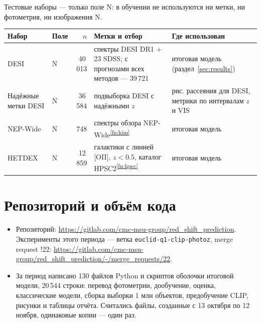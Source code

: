 \documentclass[11pt,a4paper]{article}
\newcommand{\fnref}[1]{\textsuperscript{\ref{#1}}}
\begin{document}
Тестовые наборы — только поле N: в обучении не используются ни метки, ни фотометрия, ни изображения N.

\begin{table}[H]
\centering\small
\begin{tabularx}{\linewidth}{>{\raggedright\arraybackslash}p{3.2cm}lr Y >{\raggedright\arraybackslash}p{3.3cm}}
\toprule
Набор & Поле & $n$ & Метки и отбор & Где использован \\
\midrule
DESI & N & 40\,013 & спектры DESI DR1 + 23 SDSS; с прогнозами всех методов — 39\,721 & итоговая модель (раздел~\ref{sec:results}) \\
Надёжные метки DESI & N & 36\,584 & подвыборка DESI с надёжными $z$ & рис. рассеяния для DESI, метрики по интервалам $z$ и VIS \\
NEP-Wide & N & 748 & спектры обзора NEP-Wide\fnref{fn:kim} & итоговая модель \\
HETDEX & N & 12\,859 & галактики с линией [OII], $z<0.5$, каталог HPSC2\fnref{fn:hpsc} & итоговая модель \\
\bottomrule
\end{tabularx}
\end{table}

\section{Репозиторий и объём кода}

\begin{itemize}
  \item Репозиторий: \url{https://gitlab.com/cmc-msu-group/red_shift_prediction}. Эксперименты этого периода — ветка \texttt{euclid-q1-clip-photoz}, merge request !22: \url{https://gitlab.com/cmc-msu-group/red_shift_prediction/-/merge_requests/22}.
  \item За период написано 130 файлов Python и скриптов оболочки итоговой модели, 20\,544 строки: перевод фотометрии, дообучение, оценка, классические модели, сборка выборки 1 млн объектов, предобучение CLIP, рисунки и таблицы отчёта. Считались файлы, созданные с 13 октября по 12 ноября, одинаковые копии — один раз.
\end{itemize}
\end{document}
